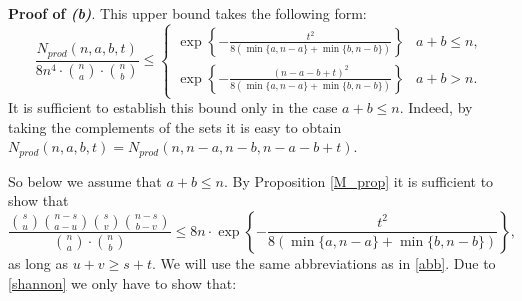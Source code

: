 \documentclass[12pt]{article}
\let\leq\leqslant
\let\geq\geqslant
\let\le\leq
\let\ge\geq
\begin{document}
\bigskip

\textbf{Proof of \emph{(b)}}.  This upper bound takes the following form:
$$\frac{N_{prod}(n,a, b, t)}{8n^4 \cdot \binom{n}{a}\cdot\binom{n}{b}} \le \begin{cases}\exp\left\{-\frac{t^2}{8\left(\min\{a, n - a\} + \min\{b, n - b\}\right)}\right\} & a + b \le n, \\[10pt] \exp\left\{-\frac{(n - a - b + t)^2}{8\left(\min\{a, n - a\} + \min\{b, n - b\}\right)}\right\} &  a + b > n.\end{cases}$$
It is sufficient to establish this bound only in the case $a + b \le n$. Indeed, by taking the complements of the sets it is easy to obtain $N_{prod}(n, a, b, t) = N_{prod}(n, n - a, n - b, n - a - b + t)$.


So below we assume that $a + b \le n$. 
 By Proposition \ref{M_prop} it is sufficient to show that 
$$\frac{\binom{s}{u} \binom{n - s}{a - u} \binom{s}{v} \binom{n - s}{b - v}}{\binom{n}{a}\cdot \binom{n}{b}} \le 8n \cdot \exp\left\{-\frac{t^2}{8 (\min\{a, n - a\}  + \min\{b, n - b\})}\right\},$$
as long as $u + v \ge s + t$. We will use the same abbreviations as in \eqref{abb}. Due to \eqref{shannon} we only have to show that:
\end{document}
